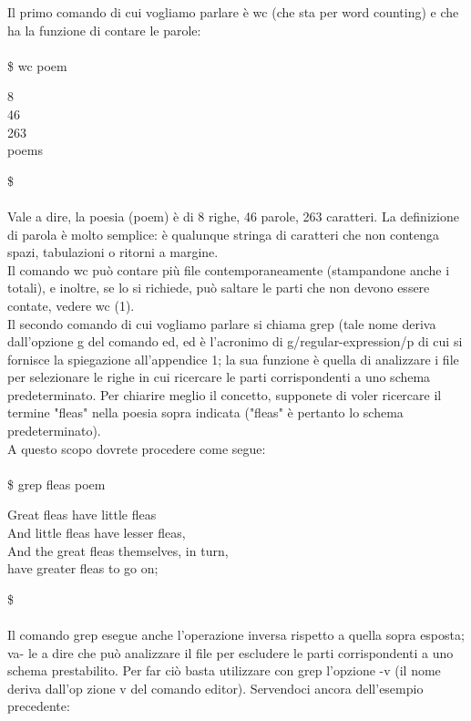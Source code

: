 Il primo comando di cui vogliamo parlare è wc (che sta per word counting) e che ha la
funzione di contare le parole:\\\\
\$ wc poem
\begin{multicols}{4}
	8 \\ 46\\ 263\\ poems
\end{multicols}
\$\\\\
Vale a dire, la poesia (poem) è di 8 righe, 46 parole, 263 caratteri. La definizione di
parola è molto semplice: è qualunque stringa di caratteri che non contenga spazi, 
tabulazioni o ritorni a margine.\\
Il comando wc può contare più file contemporaneamente (stampandone anche i totali),
e inoltre, se lo si richiede, può saltare le parti che non devono essere contate, vedere
wc (1).\\
Il secondo comando di cui vogliamo parlare si chiama grep (tale nome deriva
dall'opzione g del comando ed, ed è l'acronimo di g/regular-expression/p di cui si
fornisce la spiegazione all'appendice 1; la sua funzione è quella di analizzare i file per
selezionare le righe in cui ricercare le parti corrispondenti a uno schema predeterminato.
Per chiarire meglio il concetto, supponete di voler ricercare il termine "fleas"
nella poesia sopra indicata ("fleas" è pertanto lo schema predeterminato).\\
A questo scopo dovrete procedere come segue:\\\\
\$ grep fleas poem
\begin{center}
	Great fleas have little fleas\\
	And little fleas have lesser fleas,\\
	And the great fleas themselves, in turn,\\
	have greater fleas to go on;	\\
\end{center}
\$\\\\
Il comando grep esegue anche l'operazione inversa rispetto a quella sopra esposta; va-
le a dire che può analizzare il file per escludere le parti corrispondenti a uno schema
prestabilito. Per far ciò basta utilizzare con grep l'opzione -v (il nome deriva dall'op
zione v del comando editor). Servendoci ancora dell'esempio precedente:\\\\
